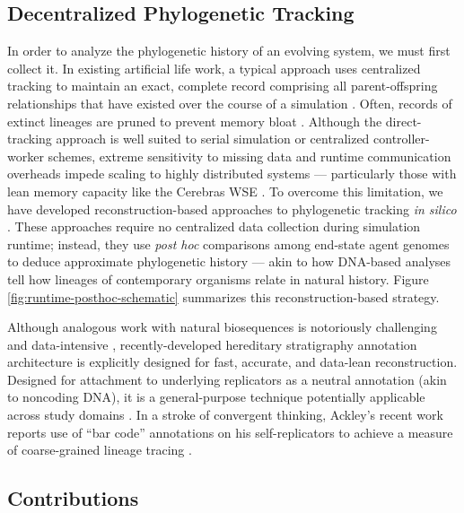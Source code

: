\subsection{Decentralized Phylogenetic Tracking}



In order to analyze the phylogenetic history of an evolving system, we must first collect it.
In existing artificial life work, a typical approach uses centralized tracking to maintain an exact, complete record comprising all parent-offspring relationships that have existed over the course of a simulation \citep{ray1992evolution,bohm2017mabe,de2012deap,garwood2019revosim,godin2019apoget,dolson2024phylotrackpy}.
Often, records of extinct lineages are pruned to prevent memory bloat \citep{moreno2024analysis}.
Although the direct-tracking approach is well suited to serial simulation or centralized controller-worker schemes, extreme sensitivity to missing data and runtime communication overheads impede scaling to highly distributed systems --- particularly those with lean memory capacity like the Cerebras WSE \citep{moreno2024analysis}.
To overcome this limitation, we have developed reconstruction-based approaches to phylogenetic tracking \textit{in silico} \citep{moreno2022hereditary}.
These approaches require no centralized data collection during simulation runtime; instead, they use \textit{post hoc} comparisons among end-state agent genomes to deduce approximate phylogenetic history --- akin to how DNA-based analyses tell how lineages of contemporary organisms relate in natural history.
Figure \ref{fig:runtime-posthoc-schematic} summarizes this reconstruction-based strategy.

Although analogous work with natural biosequences is notoriously challenging and data-intensive \citep{neyman1971molecular,lemmon2013high},
recently-developed hereditary stratigraphy annotation architecture is explicitly designed for fast, accurate, and data-lean reconstruction.
Designed for attachment to underlying replicators as a neutral annotation (akin to noncoding DNA), it is a general-purpose technique potentially applicable across study domains \citep{liben2008tracing,cohen1987computer,friggeri2014rumor}.
In a stroke of convergent thinking, Ackley's recent work reports use of ``bar code'' annotations on his self-replicators to achieve a measure of coarse-grained lineage tracing \citep{ackley2023robust}.

\subsection{Contributions}

